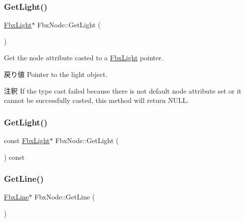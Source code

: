 \subsubsection{\texorpdfstring{Get\+Light()}{GetLight()}\hspace{0.1cm}{\footnotesize\ttfamily [1/2]}}
{\footnotesize\ttfamily \hyperlink{class_fbx_light}{Fbx\+Light}$\ast$ Fbx\+Node\+::\+Get\+Light (\begin{DoxyParamCaption}{ }\end{DoxyParamCaption})}

Get the node attribute casted to a \hyperlink{class_fbx_light}{Fbx\+Light} pointer. \begin{DoxyReturn}{戻り値}
Pointer to the light object. 
\end{DoxyReturn}
\begin{DoxyRemark}{注釈}
If the type cast failed because there is not default node attribute set or it cannot be successfully casted, this method will return {\ttfamily N\+U\+LL}. 
\end{DoxyRemark}
\mbox{\label{class_fbx_node_a8ad557a5504778a16b2fca84797b7fea}} 
\subsubsection{\texorpdfstring{Get\+Light()}{GetLight()}\hspace{0.1cm}{\footnotesize\ttfamily [2/2]}}
{\footnotesize\ttfamily const \hyperlink{class_fbx_light}{Fbx\+Light}$\ast$ Fbx\+Node\+::\+Get\+Light (\begin{DoxyParamCaption}{ }\end{DoxyParamCaption}) const}

\mbox{\label{class_fbx_node_ab13914697ec7b20a2a2b77cb77b5d3af}} 
\subsubsection{\texorpdfstring{Get\+Line()}{GetLine()}}
{\footnotesize\ttfamily \hyperlink{class_fbx_line}{Fbx\+Line}$\ast$ Fbx\+Node\+::\+Get\+Line (\begin{DoxyParamCaption}{ }\end{DoxyParamCaption})}

